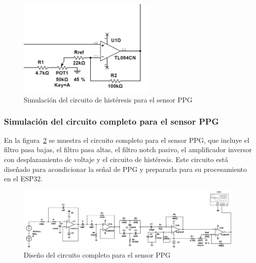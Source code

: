         \begin{figure}[H]
            \centering
            \includegraphics[width=0.6\textwidth]{img/Desarrollo/multisim_histeresis_ppg.png}
            \caption[Simulación del circuito de histéresis para el sensor PPG.]{Simulación del circuito de histéresis para el sensor PPG\footnotemark}
            \label{fig:Simulacion_Histeresis_PPG}
        \end{figure}
    
        \subsubsection{Simulación del circuito completo para el sensor PPG}

        En la figura~\ref{fig:Simulacion_Circuito_PPG} se muestra el circuito completo para el sensor PPG, que incluye el filtro pasa bajas, el filtro pasa altas, el filtro notch pasivo, el amplificador inversor con desplazamiento de voltaje y el circuito de histéresis. Este circuito está diseñado para acondicionar la señal de PPG y prepararla para su procesamiento en el ESP32.

        \begin{figure}[H]
            \centering
            \includegraphics[width=1.0\textwidth]{img/Desarrollo/multisim_circuitoPPG.png}
            \caption[Diseño del circuito completo para el sensor PPG.]{Diseño del circuito completo para el sensor PPG\footnotemark}
            \label{fig:Simulacion_Circuito_PPG}
        \end{figure}

